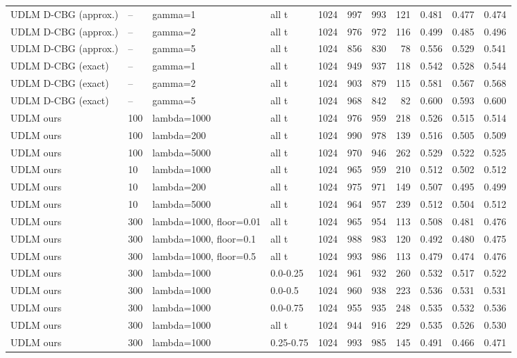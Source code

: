 \begin{tabular}{llllrrrrrrr}
UDLM D-CBG (approx.) & -- & gamma=1 & all t & 1024 & 997 & 993 & 121 & 0.481 & 0.477 & 0.474 \\
UDLM D-CBG (approx.) & -- & gamma=2 & all t & 1024 & 976 & 972 & 116 & 0.499 & 0.485 & 0.496 \\
UDLM D-CBG (approx.) & -- & gamma=5 & all t & 1024 & 856 & 830 & 78 & 0.556 & 0.529 & 0.541 \\
UDLM D-CBG (exact) & -- & gamma=1 & all t & 1024 & 949 & 937 & 118 & 0.542 & 0.528 & 0.544 \\
UDLM D-CBG (exact) & -- & gamma=2 & all t & 1024 & 903 & 879 & 115 & 0.581 & 0.567 & 0.568 \\
UDLM D-CBG (exact) & -- & gamma=5 & all t & 1024 & 968 & 842 & 82 & 0.600 & 0.593 & 0.600 \\
UDLM ours & 100 & lambda=1000 & all t & 1024 & 976 & 959 & 218 & 0.526 & 0.515 & 0.514 \\
UDLM ours & 100 & lambda=200 & all t & 1024 & 990 & 978 & 139 & 0.516 & 0.505 & 0.509 \\
UDLM ours & 100 & lambda=5000 & all t & 1024 & 970 & 946 & 262 & 0.529 & 0.522 & 0.525 \\
UDLM ours & 10 & lambda=1000 & all t & 1024 & 965 & 959 & 210 & 0.512 & 0.502 & 0.512 \\
UDLM ours & 10 & lambda=200 & all t & 1024 & 975 & 971 & 149 & 0.507 & 0.495 & 0.499 \\
UDLM ours & 10 & lambda=5000 & all t & 1024 & 964 & 957 & 239 & 0.512 & 0.504 & 0.512 \\
UDLM ours & 300 & lambda=1000, floor=0.01 & all t & 1024 & 965 & 954 & 113 & 0.508 & 0.481 & 0.476 \\
UDLM ours & 300 & lambda=1000, floor=0.1 & all t & 1024 & 988 & 983 & 120 & 0.492 & 0.480 & 0.475 \\
UDLM ours & 300 & lambda=1000, floor=0.5 & all t & 1024 & 993 & 986 & 113 & 0.479 & 0.474 & 0.476 \\
UDLM ours & 300 & lambda=1000 & 0.0-0.25 & 1024 & 961 & 932 & 260 & 0.532 & 0.517 & 0.522 \\
UDLM ours & 300 & lambda=1000 & 0.0-0.5 & 1024 & 960 & 938 & 223 & 0.536 & 0.531 & 0.531 \\
UDLM ours & 300 & lambda=1000 & 0.0-0.75 & 1024 & 955 & 935 & 248 & 0.535 & 0.532 & 0.536 \\
UDLM ours & 300 & lambda=1000 & all t & 1024 & 944 & 916 & 229 & 0.535 & 0.526 & 0.530 \\
UDLM ours & 300 & lambda=1000 & 0.25-0.75 & 1024 & 993 & 985 & 145 & 0.491 & 0.466 & 0.471 \\

\end{tabular}
